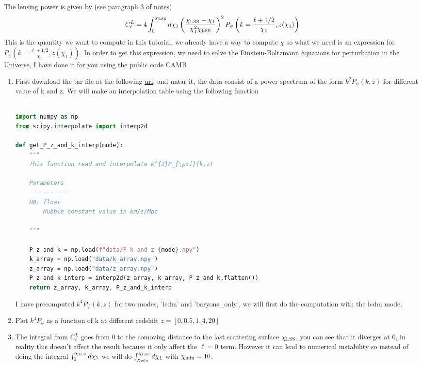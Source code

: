 \documentclass[a4paper, 11pt]{article}
\def\ba{\begin{eqnarray}}
\def\ea{\end{eqnarray}}
\begin{document}
The lensing power is given by   (see paragraph 3 of \href{https://github.com/thibautlouis/thibautlouis.github.io/blob/master/derivation.pdf}{notes})
\ba
C^{L}_{\ell} =  4  \int^{\chi_{\rm LSS}}_{0}  d\chi_{1}  \left(\frac{\chi_{\rm LSS} - \chi_{1}}{\chi^{2}_{1}\chi_{\rm LSS} } \right)^{2}  P_{\psi} \left(k = \frac{\ell + 1/2}{\chi_{1}}, z(\chi_{1}) \right) 
\ea
This is the quantity we want to compute in this tutorial, we already have a way to compute $\chi$ so what we need is an expression for $P_{\psi} \left(k = \frac{\ell + 1/2}{\chi_{1}}, z(\chi_{1}) \right) $.
In order to get this expression, we need to solve the Einstein-Boltzmann equations for perturbation in the Universe, I have done it for you using the public code CAMB




\begin{enumerate}
\item First download the tar file at the following \href{https://github.com/thibautlouis/TD_ED_Phoeenix/blob/main/data.tar.gz}{url}, and untar it, the data consist of a power spectrum of the form $k^{2}P_{\psi}(k,z)$ for different value of k and z.
We will make an interpolation table using the following function  \\ \\
 \begin{lstlisting}[language=Python]
import numpy as np
from scipy.interpolate import interp2d

def get_P_z_and_k_interp(mode):
    """
    This function read and interpolate k^{2}P_{\psi}(k,z)
    
    Parameters
     ----------
    H0: float
        Hubble constant value in km/s/Mpc

    """

    P_z_and_k = np.load(f"data/P_k_and_z_{mode}.npy")
    k_array = np.load("data/k_array.npy")
    z_array = np.load("data/z_array.npy")
    P_z_and_k_interp = interp2d(z_array, k_array, P_z_and_k.flatten())
    return z_array, k_array, P_z_and_k_interp

\end{lstlisting}
I have precomputed $k^{4}P_{\psi}(k,z)$   for two modes, 'lcdm' and 'baryons\_only', we will first do the computation with the lcdm mode.
\item Plot $k^{4}P_{\psi}$  as a function of k at different redshift $z = [0, 0.5, 1, 4 ,20]$
\item   The integral from $C^{L}_{\ell} $ goes from 0 to the comoving distance to the last scattering surface $\chi_{\rm LSS}$, you can see that it diverges at 0, in reality this doesn't affect the result because it only affect the $\ell =0$ term. However it can lead to numerical instability so instead of doing the integral  $\int^{\chi_{\rm LSS}}_{0}  d\chi_{1}$ we will do $\int^{\chi_{\rm LSS}}_{\chi_{\rm min}}  d\chi_{1}$ with $\chi_{\rm min}=10$.


\end{enumerate}
\end{document}
